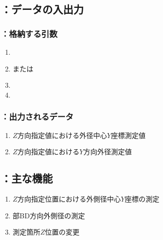 \subsection{\MYOThickness：データの入出力}

\subsubsection{\MYOThickness：格納する引数}
\begin{enumerate}[label*=\sarrow]
\item \PMBDOD
\item \PMTopReAlocationLength または\PMBottomReAlocationLength
\item \PMKeywayPos
\item \PMKeywayWidth
\end{enumerate}

\subsubsection{\MYOThickness：出力されるデータ}
\begin{enumerate}[label*=\sarrow]
\item $Z$方向指定値における外径中心$Y$座標測定値
\item $Z$方向指定値における$Y$方向外径測定値
\end{enumerate}



\subsection{\MYOThickness：主な機能}
\begin{enumerate}[label*=\sarrow]
\item $Z$方向指定位置における外側径中心$Y$座標の測定
\item \EndFace 部BD方向外側径の測定
\item 測定箇所$Z$位置の変更
\end{enumerate}



